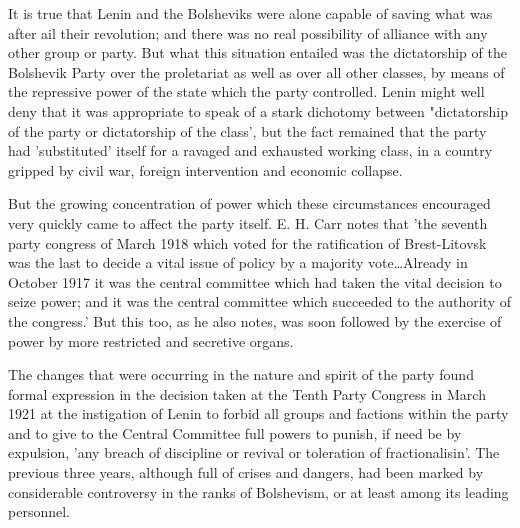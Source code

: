 It is true that Lenin and the Bolsheviks were alone capable of saving what was after ail their revolution; and there was no real possibility of alliance with any other group or party. But what this situation entailed was the dictatorship of the Bolshevik Party over the proletariat as well as over all other classes, by means of the repressive power of the state which the party controlled. Lenin might well deny that it was appropriate to speak of a stark dichotomy between "dictatorship of the party or dictatorship of the class', but the fact remained that the party had 'substituted' itself for a ravaged and exhausted working class, in a country gripped by civil war, foreign intervention and economic collapse.

But the growing concentration of power which these circumstances encouraged very quickly came to affect the party itself. E. H. Carr notes that 'the seventh party congress of March 1918 which voted for the ratification of Brest-Litovsk was the last to decide a vital issue of policy by a majority vote\dots Already in October 1917 it was the central committee which had taken the vital decision to seize power; and it was the central committee which succeeded to the authority of the congress.' But this too, as he also notes, was soon followed by the exercise of power by more restricted and secretive organs.

The changes that were occurring in the nature and spirit of the party found formal expression in the decision taken at the Tenth Party Congress in March 1921 at the instigation of Lenin to forbid all groups and factions within the party and to give to the Central Committee full powers to punish, if need be by expulsion, 'any breach of discipline or revival or toleration of fractionalisin'. The previous three years, although full of crises and dangers, had been marked by considerable controversy in the ranks of Bolshevism, or at least among its leading personnel.

